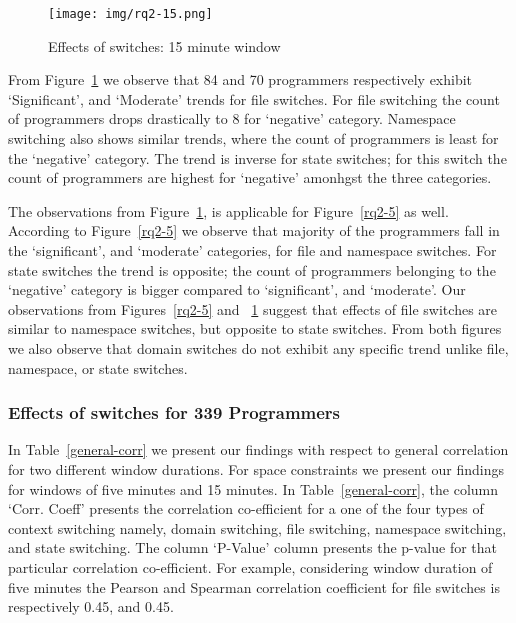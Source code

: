 \begin{figure}[htbp]
\centering
\texttt{[image: img/rq2-15.png]}
\caption{Effects of switches: 15 minute window}
\label{rq2-15}
\end{figure}


From Figure~\ref{rq2-15} we observe that 84 and 70 programmers respectively exhibit `Significant', and `Moderate' trends for file switches. For file switching the count of programmers drops drastically to 8 for `negative' category. Namespace switching 
also shows similar trends, where the count of programmers is least for the `negative'
category. The trend is inverse for state switches; for this switch the count of programmers are highest for `negative' amonhgst the three categories.  

The observations from Figure~\ref{rq2-15}, is applicable for Figure~\ref{rq2-5} as well. According to Figure~\ref{rq2-5} we observe that majority of the programmers fall in the `significant', and `moderate' categories, for file and namespace switches. For state switches the trend is opposite; the count of programmers belonging to the `negative' category is bigger compared to `significant', and `moderate'. Our observations from Figures~\ref{rq2-5} and ~\ref{rq2-15} suggest that effects of file switches are similar to namespace switches, but opposite to state switches. From both figures we also observe that domain switches do not exhibit any specific trend unlike file, namespace, or state switches.       
  




\subsubsection{Effects of switches for 339 Programmers}  

In Table~\ref{general-corr} we present our findings with respect to general correlation for two different window durations. For space constraints we present our findings for windows of five minutes and 15 minutes. In Table~\ref{general-corr}, the column `Corr. Coeff' presents the correlation co-efficient for a one of the four types of context switching namely, domain switching, file switching, namespace switching, and state switching. The column `P-Value' column presents the p-value for that particular correlation co-efficient. For example, considering window duration of five minutes 
the Pearson and Spearman correlation coefficient for file switches is respectively 0.45, and 0.45.  

